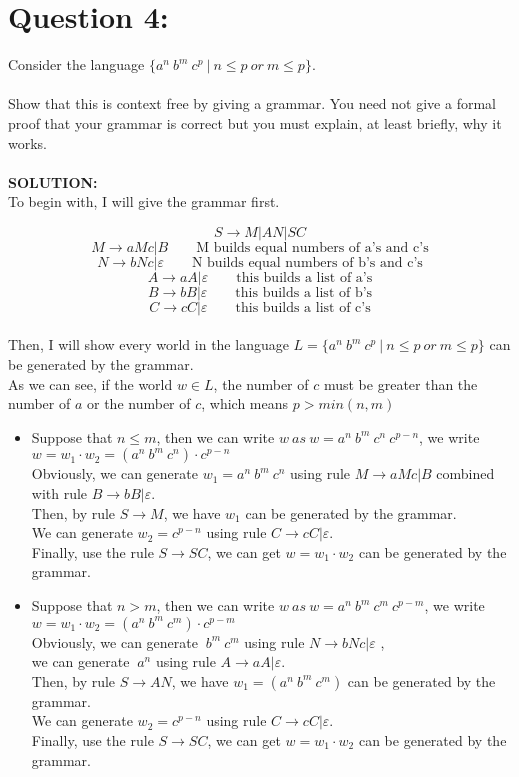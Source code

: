 \documentclass [9 pt]{article}
\theoremstyle{definition}
\begin{document}
\newpage
\section*{Question 4: }
Consider the language $\{a^n\ b^m\ c^p \ |\ n \leq p\ or\ m \leq p\}$.\\
\\
 Show that this is context free by giving a grammar. You need not give a formal proof that your grammar is correct but you must explain, at least briefly, why it works.\\
 \\
 \textbf{SOLUTION:}\\
 To begin with, I will give the grammar first.

 	$$S \to M | AN | SC$$ 
 	$$M \to aMc | B \quad\quad \text{M builds equal numbers of a's and c's}$$
 	$$N \to bNc | \varepsilon \quad\quad \text{N builds equal numbers of b's and c's} $$
 	$$A \to aA | \varepsilon \quad\quad \text{this builds a list of a's}$$
 	$$B \to bB | \varepsilon \quad\quad \text{this builds a list of b's}$$
 	$$C \to cC | \varepsilon \quad\quad \text{this builds a list of c's}$$ 
\\
Then, I will show every world in the language $L = \{a^n\ b^m\ c^p \ |\ n \leq p\ or\ m \leq p\} $ can be generated by the grammar.\\
As we can see, if the world $w \in L$, the number of $c$ must be greater than the number of $a$ or the number of $c$, which means $p > min(n, m)$
\begin{itemize}
	\item Suppose that $n \leq m$, then we can write $w \ as\ w = a^n\ b^m\ c^n\ c^{p-n} $, we write $w = w_1 \cdot w_2 = (a^n\ b^m\ c^n) \cdot c^{p-n} $\\
	Obviously, we can generate $w_1 = a^n\ b^m\ c^n $ using rule $M \to aMc | B$ combined with rule $B \to bB | \varepsilon$.\\
	Then, by rule $S \to M$, we have $w_1$ can be generated by the grammar. \\
	We can generate $w_2 = c^{p-n}$ using rule $C \to cC | \varepsilon$.\\
	Finally, use the rule $S \to SC$, we can get $w = w_1\cdot w_2$ can be generated by the grammar.\\
	\item Suppose that $n > m$, then we can write $w \ as\ w = a^n\ b^m\ c^m\ c^{p-m} $, we write $w = w_1 \cdot w_2 = (a^n\ b^m\ c^m) \cdot c^{p-m} $\\
	Obviously, we can generate $\ b^m\ c^m $ using rule $N \to bNc |\varepsilon $ ,\\
	we can generate $\ a^n $ using rule $A \to aA | \varepsilon$.\\
	Then, by rule $S \to AN$, we have $w_1 = (a^n\ b^m\ c^m) $ can be generated by the grammar. \\
	We can generate $w_2 = c^{p-n}$ using rule $C \to cC | \varepsilon$.\\
	Finally, use the rule $S \to SC$, we can get $w = w_1\cdot w_2$ can be generated by the grammar.\\

	
\end{itemize}
\end{document}
